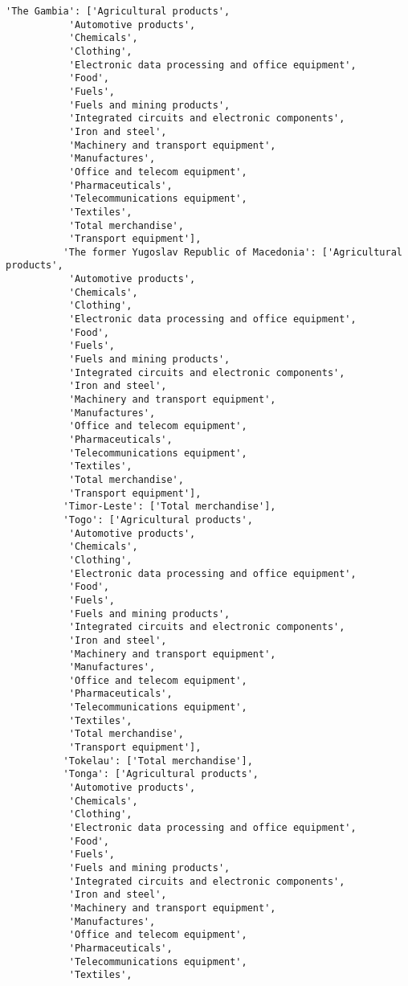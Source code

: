 \documentclass[11pt]{article}
\begin{document}
\begin{Verbatim}[commandchars=\\\{\}]
          'The Gambia': ['Agricultural products',
           'Automotive products',
           'Chemicals',
           'Clothing',
           'Electronic data processing and office equipment',
           'Food',
           'Fuels',
           'Fuels and mining products',
           'Integrated circuits and electronic components',
           'Iron and steel',
           'Machinery and transport equipment',
           'Manufactures',
           'Office and telecom equipment',
           'Pharmaceuticals',
           'Telecommunications equipment',
           'Textiles',
           'Total merchandise',
           'Transport equipment'],
          'The former Yugoslav Republic of Macedonia': ['Agricultural products',
           'Automotive products',
           'Chemicals',
           'Clothing',
           'Electronic data processing and office equipment',
           'Food',
           'Fuels',
           'Fuels and mining products',
           'Integrated circuits and electronic components',
           'Iron and steel',
           'Machinery and transport equipment',
           'Manufactures',
           'Office and telecom equipment',
           'Pharmaceuticals',
           'Telecommunications equipment',
           'Textiles',
           'Total merchandise',
           'Transport equipment'],
          'Timor-Leste': ['Total merchandise'],
          'Togo': ['Agricultural products',
           'Automotive products',
           'Chemicals',
           'Clothing',
           'Electronic data processing and office equipment',
           'Food',
           'Fuels',
           'Fuels and mining products',
           'Integrated circuits and electronic components',
           'Iron and steel',
           'Machinery and transport equipment',
           'Manufactures',
           'Office and telecom equipment',
           'Pharmaceuticals',
           'Telecommunications equipment',
           'Textiles',
           'Total merchandise',
           'Transport equipment'],
          'Tokelau': ['Total merchandise'],
          'Tonga': ['Agricultural products',
           'Automotive products',
           'Chemicals',
           'Clothing',
           'Electronic data processing and office equipment',
           'Food',
           'Fuels',
           'Fuels and mining products',
           'Integrated circuits and electronic components',
           'Iron and steel',
           'Machinery and transport equipment',
           'Manufactures',
           'Office and telecom equipment',
           'Pharmaceuticals',
           'Telecommunications equipment',
           'Textiles',

\end{Verbatim}
\end{document}
